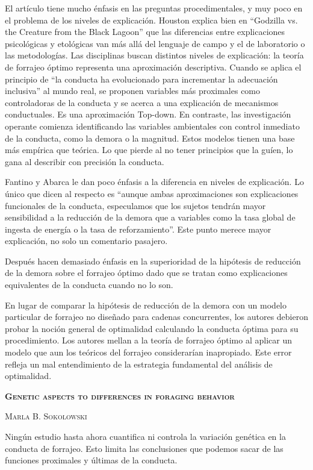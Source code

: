 \documentclass[a4paper,12pt]{article}
\begin{document}
El artículo tiene mucho énfasis en las preguntas procedimentales, y muy poco en el problema de los niveles de explicación. Houston explica bien en ``Godzilla vs. the Creature from the Black Lagoon'' que las diferencias entre explicaciones psicológicas y etológicas van más allá del lenguaje de campo y el de laboratorio o las metodologías. Las disciplinas buscan distintos niveles de explicación: la teoría de forrajeo óptimo representa una aproximación descriptiva. Cuando se aplica el principio de ``la conducta ha evolucionado para incrementar la adecuación inclusiva'' al mundo real, se proponen variables más proximales como controladoras de la conducta y se acerca a una explicación de mecanismos conductuales. Es una aproximación Top-down. En contraste, las investigación operante comienza identificando las variables ambientales con control inmediato de la conducta, como la demora o la magnitud. Estos modelos tienen una base más empírica que teórica. Lo que pierde al no tener principios que la guíen, lo gana al describir con precisión la conducta.

Fantino y Abarca le dan poco énfasis a la diferencia en niveles de explicación. Lo único que dicen al respecto es ``aunque ambas aproximaciones son explicaciones funcionales de la conducta, especulamos que los sujetos tendrán mayor sensibilidad a la reducción de la demora que a variables como la tasa global de ingesta de energía o la tasa de reforzamiento''. Este punto merece mayor explicación, no solo un comentario pasajero. 

Después hacen demasiado énfasis en la superioridad de la hipótesis de reducción de la demora sobre el forrajeo óptimo dado que se tratan como explicaciones equivalentes de la conducta cuando no lo son. 

En lugar de comparar la hipótesis de reducción de la demora con un modelo particular de forrajeo no diseñado para cadenas concurrentes, los autores debieron probar la noción general de optimalidad calculando la conducta óptima para su procedimiento. Los autores mellan a la teoría de forrajeo óptimo al aplicar un modelo que aun los teóricos del forrajeo considerarían inapropiado. Este error refleja un mal entendimiento de la estrategia fundamental del análisis de optimalidad.

{\scshape\bfseries Genetic aspects to differences in foraging behavior}

{\scshape Marla B. Sokolowski}

Ningún estudio hasta ahora cuantifica ni controla la variación genética en la conducta de forrajeo. Esto limita las conclusiones que podemos sacar de las funciones proximales y últimas de la conducta.
\end{document}
